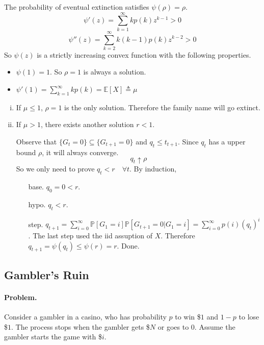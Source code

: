 The probability of eventual extinction satisfies $\psi(\rho) = \rho$.
\[ \psi'(z) = \sum_{k=1}^{\infty}kp(k)z^{k-1} > 0\]
\[ \psi''(z) = \sum_{k=2}^{\infty}k(k-1)p(k)z^{k-2} > 0 \]
So $\psi(z)$ is a strictly increasing convex function with the following properties.
\begin{itemize}
    \item $\psi(1) = 1$. So $\rho = 1$ is always a solution.
    \item $\psi'(1) = \sum_{k=1}^{\infty}kp(k) = \mathbb{E}[X] \triangleq \mu$
\end{itemize}
\begin{enumerate}[(i)]
    \item If $\mu \le 1$, $\rho = 1$ is the only solution. Therefore the family name will go extinct.
    \item If $\mu > 1$, there exists another solution $r<1$.
    
    Observe that $\{ G_t = 0 \} \subseteq \{ G_{t+1} = 0 \}$ and $q_t \le t_{t+1}$. Since $q_t$ has a upper bound $\rho$, it will always converge.
    \[ q_t \uparrow \rho \]
    So we only need to prove $q_t < r \quad \forall t$. By induction,
    \begin{itemize}
        \item[base.] $q_0 = 0 < r$.
        \item[hypo.] $q_t < r$.
        \item[step.] $q_{t+1} = \sum_{i=0}^{\infty}\mathbb{P}[G_1 = i]\mathbb{P}[G_{t+1} = 0| G_1 = i] = \sum_{i=0}^{\infty}p(i)(q_t)^i$. The last step used the iid assuption of $X$. 
        Therefore $q_{t+1} = \psi(q_t) \le \psi(r) = r$. Done.
    \end{itemize} 
\end{enumerate}

\subsection{Gambler's Ruin}\label{GamblerRuin}
\paragraph*{Problem.} Consider a gambler in a casino, who has probability $p$ to win \$$1$ and $1-p$ to lose \$$1$. The process stops when the gambler gets \$$N$ or goes to $0$. Assume the gambler starts the game with \$$i$.
